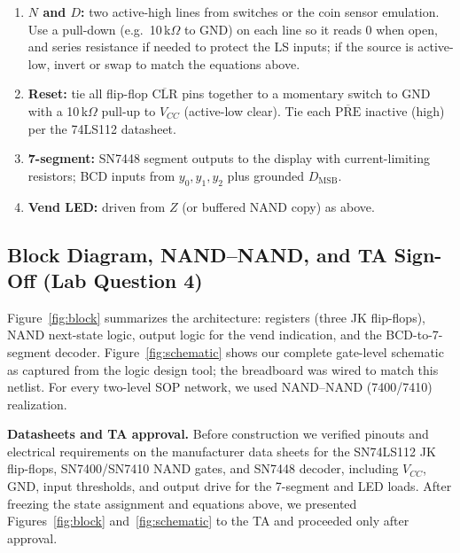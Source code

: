 \documentclass[12pt, letterpaper]{article}
\begin{document}
\begin{enumerate}
  \item[\textbf{(a)}] \textbf{$N$ and $D$:} two active-high lines from switches or the coin
        sensor emulation.  Use a pull-down (e.g.\ 10\,k$\Omega$ to GND) on each line so it
        reads 0 when open, and series resistance if needed to protect the LS inputs; if the
        source is active-low, invert or swap to match the equations above.
  \item[\textbf{(b)}] \textbf{Reset:} tie all flip-flop $\overline{\text{CLR}}$ pins together
        to a momentary switch to GND with a 10\,k$\Omega$ pull-up to $V_{CC}$ (active-low
        clear).  Tie each $\overline{\text{PRE}}$ inactive (high) per the 74LS112 datasheet.
  \item[\textbf{(c)}] \textbf{7-segment:} SN7448 segment outputs to the display with
        current-limiting resistors; BCD inputs from $y_0,y_1,y_2$ plus grounded $D_{\text{MSB}}$.
  \item[\textbf{(d)}] \textbf{Vend LED:} driven from $Z$ (or buffered NAND copy) as above.
\end{enumerate}

\subsection{Block Diagram, NAND--NAND, and TA Sign-Off (Lab Question 4)}

Figure~\ref{fig:block} summarizes the architecture: registers (three JK flip-flops), NAND
next-state logic, output logic for the vend indication, and the BCD-to-7-segment decoder.
Figure~\ref{fig:schematic} shows our complete gate-level schematic as captured from the logic
design tool; the breadboard was wired to match this netlist.  For every two-level SOP
network, we used NAND--NAND (7400/7410) realization.

\textbf{Datasheets and TA approval.}  Before construction we verified pinouts and electrical
requirements on the manufacturer data sheets for the SN74LS112 JK flip-flops, SN7400/SN7410
NAND gates, and SN7448 decoder, including $V_{CC}$, GND, input thresholds, and output drive for
the 7-segment and LED loads.  After freezing the state assignment and equations above, we
presented Figures~\ref{fig:block} and~\ref{fig:schematic} to the TA and proceeded only after
approval.
\end{document}
